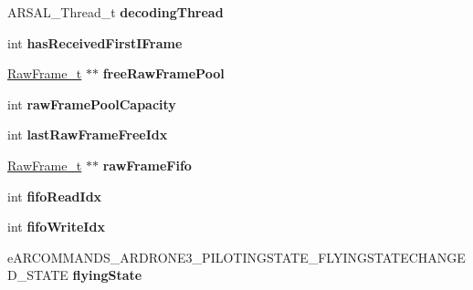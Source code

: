 \begin{DoxyCompactItemize}
\item 
\hypertarget{structBD__MANAGER__t_a3c9a5b9341aa85c22b72c24f770efbfc}{}A\+R\+S\+A\+L\+\_\+\+Thread\+\_\+t {\bfseries decoding\+Thread}\label{structBD__MANAGER__t_a3c9a5b9341aa85c22b72c24f770efbfc}

\item 
\hypertarget{structBD__MANAGER__t_a54f024337acceb7ce1089601a87ad26a}{}int {\bfseries has\+Received\+First\+I\+Frame}\label{structBD__MANAGER__t_a54f024337acceb7ce1089601a87ad26a}

\item 
\hypertarget{structBD__MANAGER__t_afe2c94ee00d4d7df1bc71c76a2f1d872}{}\hyperlink{structRawFrame__t}{Raw\+Frame\+\_\+t} $\ast$$\ast$ {\bfseries free\+Raw\+Frame\+Pool}\label{structBD__MANAGER__t_afe2c94ee00d4d7df1bc71c76a2f1d872}

\item 
\hypertarget{structBD__MANAGER__t_a84e33c551070a412584db86affa5556e}{}int {\bfseries raw\+Frame\+Pool\+Capacity}\label{structBD__MANAGER__t_a84e33c551070a412584db86affa5556e}

\item 
\hypertarget{structBD__MANAGER__t_acb813713bc178fb42cc105f7286be18d}{}int {\bfseries last\+Raw\+Frame\+Free\+Idx}\label{structBD__MANAGER__t_acb813713bc178fb42cc105f7286be18d}

\item 
\hypertarget{structBD__MANAGER__t_a59e57c4b1aaf89bdbb7cf27f0d648e3b}{}\hyperlink{structRawFrame__t}{Raw\+Frame\+\_\+t} $\ast$$\ast$ {\bfseries raw\+Frame\+Fifo}\label{structBD__MANAGER__t_a59e57c4b1aaf89bdbb7cf27f0d648e3b}

\item 
\hypertarget{structBD__MANAGER__t_ad2248d39ae81fb5b81e10f9973d86ed2}{}int {\bfseries fifo\+Read\+Idx}\label{structBD__MANAGER__t_ad2248d39ae81fb5b81e10f9973d86ed2}

\item 
\hypertarget{structBD__MANAGER__t_a547f77e4bd8b7d19ecbac517f1187cb6}{}int {\bfseries fifo\+Write\+Idx}\label{structBD__MANAGER__t_a547f77e4bd8b7d19ecbac517f1187cb6}

\item 
\hypertarget{structBD__MANAGER__t_a990ba28467879eab9f74dc1abb701e86}{}e\+A\+R\+C\+O\+M\+M\+A\+N\+D\+S\+\_\+\+A\+R\+D\+R\+O\+N\+E3\+\_\+\+P\+I\+L\+O\+T\+I\+N\+G\+S\+T\+A\+T\+E\+\_\+\+F\+L\+Y\+I\+N\+G\+S\+T\+A\+T\+E\+C\+H\+A\+N\+G\+E\+D\+\_\+\+S\+T\+A\+T\+E {\bfseries flying\+State}\label{structBD__MANAGER__t_a990ba28467879eab9f74dc1abb701e86}


\end{DoxyCompactItemize}
